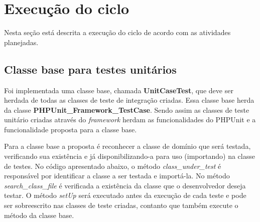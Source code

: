   \section{Execução do ciclo}

    Nesta seção está descrita a execução do ciclo de acordo com as atividades planejadas.
      
    \subsection{Classe base para testes unitários}

        Foi implementada uma classe base, chamada \textbf{UnitCaseTest}, que deve ser herdada de todas as classes de teste de integração criadas. 
        Essa classe base herda da classe \textbf{PHPUnit\_Framework\_TestCase}. Sendo assim as classes de teste unitário criadas através do \textit{framework} herdam as funcionalidades do PHPUnit e a funcionalidade proposta para a classe base.

        Para a classe base a proposta é reconhecer a classe de domínio que será testada, verificando sua existência e já disponibilizando-a para uso (importando) na classe de testes. No código apresentado abaixo, o método \textit{class\_under\_test} é responsável por identificar a classe a ser testada e importá-la. No método \textit{search\_class\_file} é verificada a existência da classe que o desenvolvedor deseja testar. O método \textit{setUp} será executado antes da execução de cada teste e pode ser sobreescrito nas classes de teste criadas, contanto que também execute o método da classe base.  

